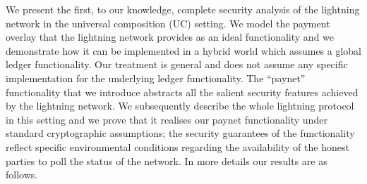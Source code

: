 We present the first, to our knowledge, complete  security analysis of the lightning network in the universal composition (UC) setting. 
We model the payment overlay that the lightning network provides as an ideal functionality and we demonstrate how it can be implemented in a hybrid world which assumes a global ledger functionality. Our treatment is general and does not assume any specific implementation for the underlying ledger functionality. The ``paynet''  functionality that we introduce abstracts all the salient security features achieved by the lightning network. We subsequently describe the whole lightning protocol in this setting and we prove that it realises our paynet functionality under standard cryptographic assumptions; the security guarantees of the functionality reflect specific environmental conditions regarding the availability of the honest parties to poll the status of the network. In more details our results are as follows. 

